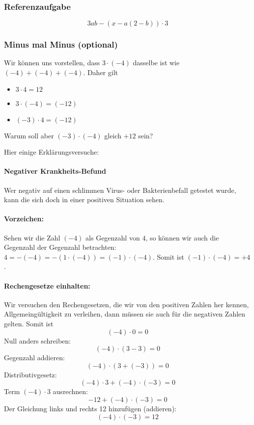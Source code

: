 \subsubsection{Referenzaufgabe}
$$3ab-(x-a(2-b))\cdot{}3$$



\newpage
\subsubsection{Minus mal Minus (optional)}
Wir können uns vorstellen, dass $3 \cdot (-4)$ dasselbe ist wie $(-4) + (-4) + (-4)$. Daher gilt
\begin{itemize}
\item $3 \cdot 4 = 12$
\item $3 \cdot (-4) = (-12)$
\item $(-3) \cdot 4 = (-12)$
\end{itemize}
Warum soll aber $(-3)\cdot(-4)$ gleich $+12$ sein?

Hier einige Erklärungsversuche:


\paragraph{Negativer Krankheits-Befund}
Wer negativ auf einen schlimmen Virus- oder Bakterienbefall getestet wurde, kann
die sich doch in einer positiven Situation sehen.

\paragraph{Vorzeichen:} Sehen wir die Zahl $(-4)$ als Gegenzahl von $4$, so können wir auch die Gegenzahl der Gegenzahl betrachten:
$4 = -(-4) = -(1\cdot(-4)) = (-1)\cdot(-4)$. Somit ist $(-1)\cdot(-4) = +4$.

\paragraph{Rechengesetze einhalten:} Wir versuchen den Rechengesetzen, die wir von den positiven Zahlen her kennen, Allgemeingültigkeit zu verleihen, dann müssen sie auch für die negativen Zahlen gelten.
Somit ist
$$(-4)          \cdot 0 = 0$$
Null anders schreiben:
$$(-4)    \cdot (3-3) = 0$$
Gegenzahl addieren:
$$(-4)\cdot(3 + (-3)) = 0$$
Distributivgesetz:
$$(-4)\cdot3 + (-4)\cdot (-3) = 0$$
Term $(-4)\cdot3$ ausrechnen:
$$-12 + (-4)\cdot (-3)= 0$$
Der Gleichung links und rechts 12 hinzufügen (addieren):
$$(-4)\cdot (-3) = 12$$

